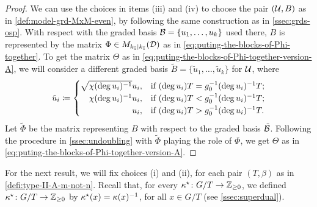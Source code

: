 \begin{proof}
    We can use the choices in items (iii) and (iv) to choose the pair $(\mathcal U, B)$ as in \cref{def:model-grd-MxM-even}, by following the same construction as in \cref{ssec:grds-osp}. 
    With respect with the graded basis $\mathcal B = \{ u_1, \ldots, u_k \}$ used there, $B$ is represented by the matrix $\Phi \in M_{k_{\bar{0}} | k_{\bar{1}}}(\mathcal{D})$ as in \cref{eq:puting-the-blocks-of-Phi-together}. 
    To get the matrix $\Theta$ as in \cref{eq:puting-the-blocks-of-Phi-together-version-A}, we will consider a different graded basis $\tilde B = \{ \tilde u_1, \ldots, \tilde u_k \}$ for $\mathcal U$, where
    \[
        \tilde u_i \coloneqq 
        \begin{cases}
            \sqrt{\chi(\deg u_i)\inv} u_i, & \text{if }(\deg u_i) T = g_0\inv (\deg u_i)\inv T;\\
            \hfill \chi(\deg u_i)\inv u_i, & \text{if }(\deg u_i) T < g_0\inv (\deg u_i)\inv T;\\
            \hfill u_i, & \text{if }(\deg u_i) T > g_0\inv (\deg u_i)\inv T.
        \end{cases}
    \]
    Let $\tilde \Phi$ be the matrix representing $B$ with respect to the graded basis $\tilde {\mathcal B}$. 
    Following the procedure in \cref{ssec:undoubling} with $\tilde \Phi$ playing the role of $\Phi$, we get  $\Theta$ as in \cref{eq:puting-the-blocks-of-Phi-together-version-A}. 
\end{proof}

For the next result, we will fix choices (i) and (ii), for each pair $(T, \beta)$ as in \cref{defi:type-II-A-m-not-n}. 
Recall that, for every $\kappa^\star\colon G/T \to \mathbb{Z}_{\geq 0}$, we defined $\kappa^\star\colon G/T \to \mathbb{Z}_{\geq 0}$ by $\kappa^\star(x) = \kappa(x)^{-1}$, for all $x \in G/T$ (see \cref{ssec:superdual}).

